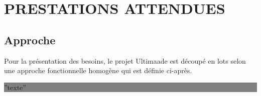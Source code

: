 \documentclass{ultimaade-fr}
\begin{document}
\newpage
\chapter{PRESTATIONS ATTENDUES}

\section {Approche}
Pour  la  présentation  des  besoins,  le  projet  Ultimaade  est  découpé  en  lots  selon  une approche fonctionnelle homogène qui est définie ci-après.


\colorbox{gray}{%
   \begin{minipage}{\textwidth}
      ''texte''
   \end{minipage}%
}

\end{document}
